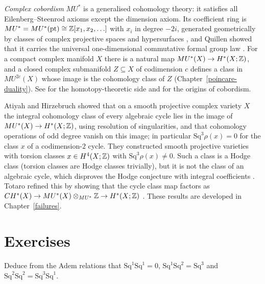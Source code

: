 \begin{remark}\label{cohomology-operations:remark-cobordism}
\emph{Complex cobordism} $MU^*$ is a generalised cohomology theory: it satisfies all Eilenberg--Steenrod axioms except the dimension axiom. Its coefficient ring is
$MU^* = MU^*(\mathrm{pt}) \cong \mathbb{Z}[x_1, x_2, \ldots]$ with $x_i$ in degree $-2i$, generated geometrically by classes of complex projective spaces and hypersurfaces
\cite{stong-cobordism}, and Quillen showed that it carries the universal one-dimensional commutative formal group law \cite{quillen-1969}. For a compact complex manifold
$X$ there is a natural map $MU^*(X) \to H^*(X; \mathbb{Z})$, and a closed complex submanifold $Z \subseteq X$ of codimension $c$ defines a class in $MU^{2c}(X)$ whose image is the cohomology class
of $Z$ (Chapter~\ref{poincare-duality}). See \cite{ravenel-green} for the homotopy-theoretic side and \cite{thom-1954} for the origins of cobordism.
\end{remark}

\begin{remark}\label{cohomology-operations:remark-atiyah-hirzebruch}
Atiyah and Hirzebruch showed that on a smooth projective complex variety $X$ the integral cohomology class of every algebraic cycle lies in the image of $MU^*(X) \to H^*(X; \mathbb{Z})$,
using resolution of singularities, and that cohomology operations of odd degree vanish on this image; in particular $\mathrm{Sq}^3\rho(x) = 0$ for the class $x$ of a codimension-$2$
cycle. They constructed smooth projective varieties with torsion classes $x \in H^4(X; \mathbb{Z})$ with $\mathrm{Sq}^3\rho(x) \neq 0$. Such a class is a Hodge class (torsion classes are
Hodge classes trivially), but it is not the class of an algebraic cycle, which disproves the Hodge conjecture with integral coefficients \cite{atiyah-hirzebruch-1962}. Totaro
refined this by showing that the cycle class map factors as $CH^*(X) \to MU^*(X) \otimes_{MU^*} \mathbb{Z} \to H^*(X; \mathbb{Z})$ \cite{totaro-1997}. These results are developed in
Chapter~\ref{failures}.
\end{remark}

\section{Exercises}\label{cohomology-operations:section-exercises}

\begin{exercise}\label{cohomology-operations:exercise-adem-small}
Deduce from the Adem relations that $\mathrm{Sq}^1\mathrm{Sq}^1 = 0$, $\mathrm{Sq}^1\mathrm{Sq}^2 = \mathrm{Sq}^3$ and $\mathrm{Sq}^2\mathrm{Sq}^2 = \mathrm{Sq}^3\mathrm{Sq}^1$.
\end{exercise}

